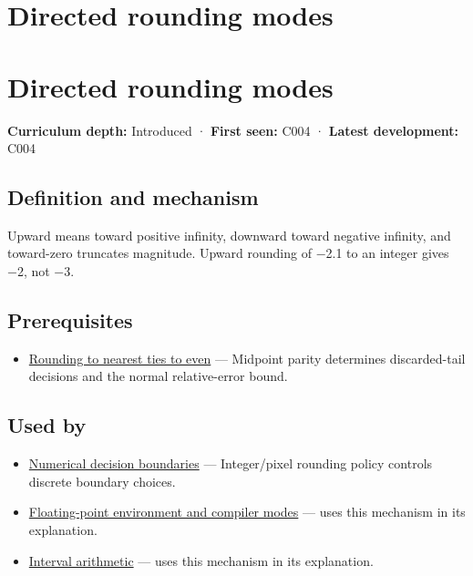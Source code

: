\hypertarget{appendix-637d164ae5ca}{}
\section*{Directed rounding modes}
\section{Directed rounding modes}\label{appendix-637d164ae5ca-directed-rounding-modes}

\textbf{Curriculum depth:} Introduced · \textbf{First seen:} C004 · \textbf{Latest development:} C004

\subsection{Definition and mechanism}\label{appendix-637d164ae5ca-definition-and-mechanism}

Upward means toward positive infinity, downward toward negative infinity, and toward-zero truncates magnitude. Upward rounding of −2.1 to an integer gives −2, not −3.

\subsection{Prerequisites}\label{appendix-637d164ae5ca-prerequisites}

\begin{itemize}
\tightlist
\item
  \hyperref[appendix-614afe1de592]{Rounding to nearest ties to even} --- Midpoint parity determines discarded-tail decisions and the normal relative-error bound.
\end{itemize}

\subsection{Used by}\label{appendix-637d164ae5ca-used-by}

\begin{itemize}
\item
  \hyperref[appendix-c80db39080be]{Numerical decision boundaries} --- Integer/pixel rounding policy controls discrete boundary choices.
\item
  \hyperref[appendix-f11d1a521253]{Floating-point environment and compiler modes} --- uses this mechanism in its explanation.
\item
  \hyperref[appendix-1823a14330cb]{Interval arithmetic} --- uses this mechanism in its explanation.
\end{itemize}

